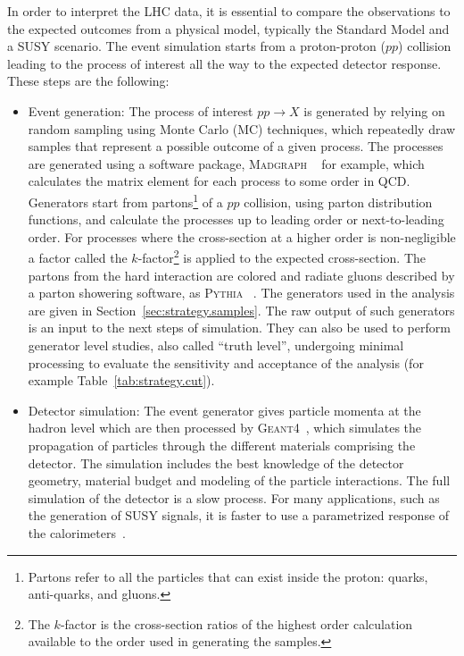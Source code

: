 In order to interpret the LHC data, it is essential to compare the observations to the expected outcomes from a physical model, typically the Standard Model and a SUSY scenario.
The event simulation starts from a proton-proton ($pp$) collision leading to the process of interest all the way to the expected detector response. 
These steps are the following:

\begin{itemize} 
\item Event generation: The process of interest $pp \to X$ is generated by relying on random sampling using Monte Carlo (MC) techniques, which repeatedly draw samples that represent 
  a possible outcome of a given process. The processes are generated using a software package, \textsc{Madgraph} ~\cite{Alwall:2014hca} for example, which calculates the matrix element 
  for each process to some order in QCD. Generators start from partons\footnote{Partons refer to all the particles that can exist inside 
the proton: quarks, anti-quarks, and gluons.} of a $pp$ collision, using parton distribution functions, and calculate the processes up to leading order or next-to-leading order. 
  For processes where the cross-section at a higher order is non-negligible a factor called the $k$-factor\footnote{The $k$-factor 
  is the cross-section ratios of the highest order calculation available to the order used in generating the samples.} 
  is applied to the expected cross-section. 
  The partons from the hard interaction are colored and radiate gluons described by a parton showering software, as \textsc{Pythia} ~\cite{Sjostrand:2007gs}. The generators used in the analysis 
  are given in Section~\ref{sec:strategy.samples}. 
  The raw output of such generators 
  is an input to the next steps of simulation. They can also be used to perform generator level studies, also called ``truth level'', undergoing minimal processing to evaluate the 
  sensitivity and  acceptance of the analysis (for example Table~\ref{tab:strategy.cut}).
\item Detector simulation: The event generator gives particle momenta at the hadron level which are then processed by \textsc{Geant4}~\cite{Agostinelli:2002hh}, which simulates
  the propagation of particles through the different materials comprising the detector. The simulation includes  the best knowledge of the detector 
geometry, material budget and modeling of the particle interactions.
The full simulation of the detector is a slow process. For many applications, such as the generation 
  of SUSY signals, it is faster to use a parametrized response of the calorimeters~\cite{ATL-PHYS-PUB-2010-013}.

\end{itemize}
